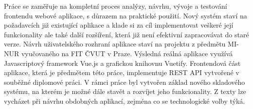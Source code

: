 Práce se zaměřuje na kompletní proces analýzy, návrhu, vývoje a testování frontendu webové aplikace, s důrazem na praktické použití. Nový systém staví na požadavcích již existující aplikace a klade si za cíl implementovat veškeré její funkcionality ale také další rozšíření, která již není efektivní zapracovávat do staré verze. Návrh uživatelského rozhraní aplikace staví na projektu z předmětu MI-NUR vyučovaného na FIT ČVUT v Praze. Výsledná reálná aplikace využívá Javascriptový framework Vue.js a grafickou knihovnu Vuetify. Frontendová část aplikace, která je předmětem této práce, implementuje REST API vytvořené v souběžné diplomové práci. V rámci práce byl vytvořen základ nového skladového systému, na kterém je možné dále stavět a rozvíjet jeho funkcionality. Z texty lze vycházet při návrhu obdobných aplikací, zejména co se technologické volby týká.
